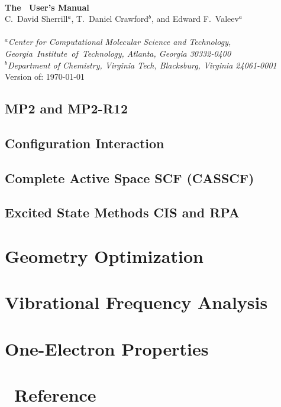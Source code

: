 \documentclass[12pt]{article}
\begin{document}


\begin{center}
\ \\
\vspace{2.0in}
{\bf {\Large The \PSIthree\ User's Manual}} \\
\vspace{0.5in}
C.~David Sherrill$^a$, T.~Daniel Crawford$^b$, and Edward F.~Valeev$^a$\\
\ \\
{\em $^a$Center for Computational Molecular Science and Technology, 
  \mbox{Georgia Institute of Technology,} Atlanta, Georgia 30332-0400} \\
\vspace{0.1in}
{\em $^b$Department of Chemistry, Virginia Tech, Blacksburg, Virginia 
  24061-0001}
\ \\
\vspace{0.3in}
Version of: \today
\end{center}

\thispagestyle{empty}

\newpage
\newpage





  
  \subsection{MP2 and MP2-R12}
  
  \subsection{Configuration Interaction}
  \subsection{Complete Active Space SCF (CASSCF)}
  \subsection{Excited State Methods CIS and RPA}
\section{Geometry Optimization}
\section{Vibrational Frequency Analysis}
\section{One-Electron Properties}

\newpage
\appendix
\section{\PSIthree\ Reference}\label{PSI_Reference}
%

%



\end{document}
